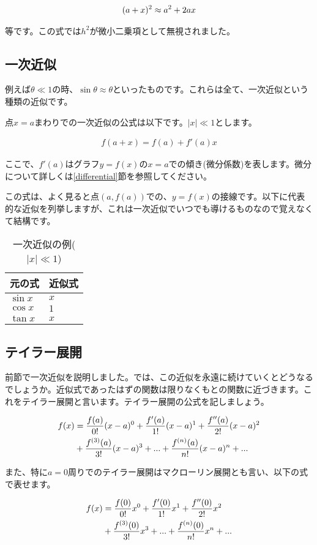 \begin{eqnarray}
    (a+x)^2 \approx a^2 + 2ax \notag
\end{eqnarray}

等です。この式では$h^2$が微小二乗項として無視されました。




\subsection{一次近似}
例えば$\theta\ll1$の時、$\sin\theta \approx\theta$といったものです。これらは全て、一次近似という種類の近似です。

点$x=a$まわりでの一次近似の公式は以下です。$|x|\ll1$とします。

\begin{eqnarray}
    f(a+x) = f(a)+f'(a)x
\end{eqnarray}

ここで、$f'(a)$はグラフ$y=f(x)$の$x=a$での傾き(微分係数)を表します。微分について詳しくは\ref{differential}節を参照してください。

この式は、よく見ると点$(a,f(a))$での、$y=f(x)$の接線です。以下に代表的な近似を列挙しますが、これは一次近似でいつでも導けるものなので覚えなくて結構です。

\begin{table}[htb]
 \begin{center}
  \caption{一次近似の例($|x|\ll1$)}
  \label{tab:approx}
  \begin{tabular}{l|l}
    \hline
    元の式 & 近似式 \\
    \hline \hline
    $\sin x$ & $x$ \\
    $\cos x$ & $1$ \\
    $\tan x$ & $x$
  \end{tabular}
 \end{center}
\end{table}


\subsection{テイラー展開}
\label{taylor}
前節で一次近似を説明しました。では、この近似を永遠に続けていくとどうなるでしょうか。近似式であったはずの関数は限りなくもとの関数に近づきます。これをテイラー展開と言います。テイラー展開の公式を記しましょう。

\begin{eqnarray}
    f(x) &= \frac{f(a)}{0!}(x-a)^0 + \frac{f'(a)}{1!}(x-a)^1 + \frac{f''(a)}{2!}(x-a)^2 \notag \\
    &+ \frac{f^{(3)}(a)}{3!}(x-a)^3+... + \frac{f^{(n)}(a)}{n!}(x-a)^n + ...
\end{eqnarray}

また、特に$a=0$周りでのテイラー展開はマクローリン展開とも言い、以下の式で表せます。

\begin{eqnarray}
    f(x) &= \frac{f(0)}{0!}x^0 + \frac{f'(0)}{1!}x^1 + \frac{f''(0)}{2!}x^2 \notag \\
    &+ \frac{f^{(3)}(0)}{3!}x^3+... + \frac{f^{(n)}(0)}{n!}x^n + ...
\end{eqnarray}